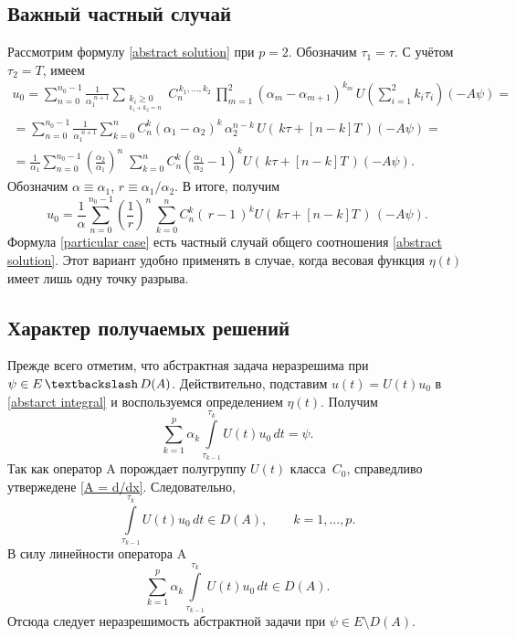 \documentclass{article}
\renewcommand{\ge}{\geqslant}
\theoremstyle{definition}
\begin{document}
\subsection{Важный частный случай}
Рассмотрим формулу \eqref{abstract solution} при $p = 2$. 
Обозначим $ \tau_1 = \tau $. С учётом $\tau_2 = T$, имеем 
\begin{gather*}
	u_0 = \sum\limits_{n = 0}^{n_0 - 1} \frac{1}{\alpha_1^{\,\,n + 1}}\sum\limits_{\substack{{k_i \ge 0} \\_{k_1 + k_2 = n
	}}}C_n^{\,k_1, ..., k_2}\,
	\prod_{m = 1}^{2}(\alpha_m - \alpha_{m + 1})^{k_m}\,U\!\left( \sum\limits_{i = 1}^{2}k_i\tau_i \right)(-A\psi) = \\[2mm]
	= \sum\limits_{n = 0}^{n_0 - 1} \frac{1}{\alpha_1^{\,\,n + 1}}
	\sum\limits_{k = 0}^n C_n^{k} (\alpha_1 - \alpha_2)^k\, \alpha_2^{n - k}\,U(\,k\tau + [n - k]T\,) (-A\psi) = \\[2mm]
	= \frac{1}{\alpha_1}\sum\limits_{n = 0}^{n_0 - 1} \left(\frac{\alpha_2}{\alpha_1}\right)^{\!\!n} \;
	\sum\limits_{k = 0}^n C_n^{k} \left(\frac{\alpha_1}{\alpha_2} - 1\right)^{\!k} \! U(\,k\tau + [n - k]T\,) (-A\psi).
\end{gather*}
Обозначим $ \alpha \equiv \alpha_1 $, $ r \equiv \alpha_1/\alpha_2 $. В итоге, получим
\begin{equation} \label{particular case}
	u_0 = \frac{1}{\alpha}\sum\limits_{n = 0}^{n_0 - 1} 
	\left( \frac{1}{r} \right)^{\!\!n}\,
	\sum_{k = 0}^{n}C_n^k \left(\, r - 1 \,\right)^k U(\, k\tau + [n - k]T \,)\, (-A\psi).
\end{equation}
Формула \eqref{particular case} есть частный случай общего соотношения \eqref{abstract solution}. Этот вариант
удобно применять в случае, когда весовая функция $\eta(t)$ имеет лишь одну точку разрыва.

\subsection{Характер получаемых решений}
Прежде всего отметим, что абстрактная задача неразрешима при \linebreak $ \psi \in E \, \textbackslash \, D(A) $. 
Действительно, подставим $ u(t) = U(t)u_0 $ в \eqref{abstarct integral} и воспользуемся определением $\eta(t)$. Получим
\begin{equation} \label{sum_int = psi}
	\sum\limits_{k = 1}^{p} \alpha_k \int\limits_{\tau_{k - 1}}^{\tau_k} U(t)u_0\,dt = \psi.
\end{equation}
Так как оператор A порождает полугруппу $U(t)$ класса~$C_0$, справедливо утвержедене \ref{A = d/dx}. 
Следовательно,
\begin{equation*}
	\int\limits_{\tau_{k - 1}}^{\tau_k} U(t)u_0\,dt \in D(A), \qquad k = 1, ..., p.
\end{equation*}
В силу линейности оператора A
\begin{equation*}
	\sum\limits_{k = 1}^{p} \alpha_k \int\limits_{\tau_{k - 1}}^{\tau_k} U(t)u_0\,dt \in D(A).
\end{equation*}
Отсюда следует неразрешимость абстрактной задачи при $\psi \in E \setminus D(A)$.
\end{document}

